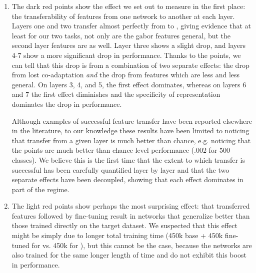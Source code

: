 \begin{enumerate}
\item The dark red  points show the effect we set out to measure in the first place: the transferability of features from one network to another at each layer. Layers one and two transfer almost perfectly from  to  , giving evidence that at least for our two tasks, not only are the gabor features general, but the second layer features are as well. Layer three shows a slight drop, and layers 4-7 show a more significant drop in performance. Thanks to the  points, we can tell that this drop is from a combination of two separate effects: the drop from lost co-adaptation \emph{and} the drop from features which are less and less general. On layers 3, 4, and 5, the first effect dominates, whereas on layers 6 and 7 the first effect diminishes and the specificity of representation dominates the drop in performance.

Although examples of successful feature transfer have been reported elsewhere in the literature, to our knowledge these results have been limited to noticing that transfer from a given layer is much better than chance, e.g. noticing that the  points are much better than chance level performance (.002 for 500 classes). We believe this is the first time that the extent to which transfer is successful has been carefully quantified layer by layer and that the two separate effects have been decoupled, showing that each effect dominates in part of the regime.

\item The light red  points show perhaps the most surprising effect: that transferred features followed by fine-tuning result in networks that generalize better than those trained directly on the target dataset. We suspected that this effect might be simply due to longer total training time (450k base + 450k fine-tuned for  vs. 450k for ), but this cannot be the case, because the  networks are also trained for the same longer length of time and do not exhibit this boost in performance.


\end{enumerate}
